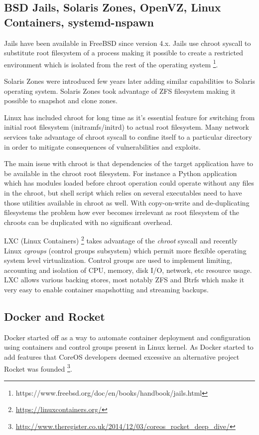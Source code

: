 \documentclass{article}
\begin{document}
\subsection{BSD Jails, Solaris Zones, OpenVZ, Linux Containers, systemd-nspawn}

Jails have been available in FreeBSD since version 4.x. Jails use chroot
syscall to substitute root filesystem of a process making it possible to
create a restricted environment which is isolated from the rest of the
operating system
\footnote{https://www.freebsd.org/doc/en/books/handbook/jails.html}.

Solaris Zones were introduced few years later adding similar capabilities to Solaris operating system. Solaris Zones took advantage of ZFS filesystem making it possible to snapshot and clone zones.

Linux has included chroot for long time as it's essential feature for switching from initial root filesystem (initramfs/initrd) to actual root filesystem.
Many network services take advantage of chroot syscall to confine
itself to a particular directory in order to mitigate consequences
of vulnerabilities and exploits.

The main issue with chroot is that dependencies of the target
application have to be available in the chroot root filesystem.
For instance a Python application which has modules loaded before
chroot operation could operate without any files in the chroot,
but shell script which relies on several executables need to have
those utilities available in chroot as well.
With copy-on-write and de-duplicating filesystems the problem
how ever becomes irrelevant as root
filesystem of the chroots can be duplicated with no significant overhead.

LXC (Linux Containers) 
\footnote{\url{https://linuxcontainers.org/}}
takes advantage of the \emph{chroot} syscall and
recently Linux \emph{cgroups} (control groups subsystem) which permit
more flexible operating system level virtualization.
Control groups are used to implement limiting, accounting
and isolation of CPU, memory, disk I/O, network, etc resource usage.
LXC allows various backing stores, most notably ZFS and Btrfs
which make it very easy to enable container snapshotting
and streaming backups.

\subsection{Docker and Rocket}

Docker started off as a way to automate container deployment and
configuration using containers and control groups present in Linux
kernel. As Docker started to add features that CoreOS developers
deemed excessive an alternative project Rocket was founded
\footnote{\url{http://www.theregister.co.uk/2014/12/03/coreos_rocket_deep_dive/}}.
\end{document}

